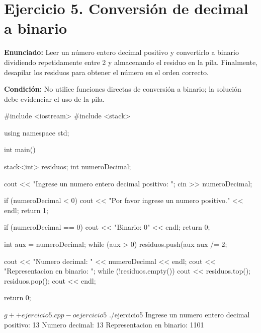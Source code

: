 \documentclass[11pt, a4paper]{article}
\begin{document}
\newpage

\section*{Ejercicio 5. Conversión de decimal a binario}

\textbf{Enunciado:} Leer un número entero decimal positivo y convertirlo a binario dividiendo repetidamente entre 2 y almacenando el residuo en la pila. Finalmente, desapilar los residuos para obtener el número en el orden correcto.

\textbf{Condición:} No utilice funciones directas de conversión a binario; la solución debe evidenciar el uso de la pila.

\begin{codebox}[title={CÓDIGO FUENTE: Ejercicio 5}]
#include <iostream>
#include <stack>

using namespace std;

int main() {
    stack<int> residuos;
    int numeroDecimal;

    cout << "Ingrese un numero entero decimal positivo: ";
    cin >> numeroDecimal;

    if (numeroDecimal < 0) {
        cout << "Por favor ingrese un numero positivo." << endl;
        return 1;
    }

    if (numeroDecimal == 0) {
        cout << "Binario: 0" << endl;
        return 0;
    }

    int aux = numeroDecimal;
    while (aux > 0) {
        residuos.push(aux %
        aux /= 2;
    }

    cout << "Numero decimal: " << numeroDecimal << endl;
    cout << "Representacion en binario: ";
    while (!residuos.empty()) {
        cout << residuos.top();
        residuos.pop();
    }
    cout << endl;

    return 0;
}
\end{codebox}

\begin{terminalout}
$ g++ ejercicio5.cpp -o ejercicio5
$ ./ejercicio5
Ingrese un numero entero decimal positivo: 13
Numero decimal: 13
Representacion en binario: 1101
\end{terminalout}

\newpage

\end{document}
